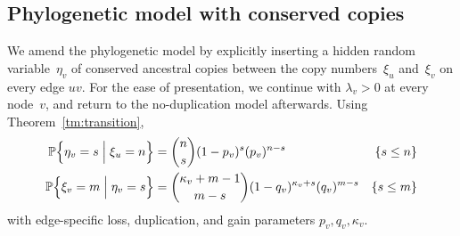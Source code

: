 \documentclass{elsarticle}
\newcommand{\condgen}[6]{{#1}#2 #5 #3 #6 #4}
\newcommand{\EXP}{\mathbb{E}}
\newcommand{\PROB}{\mathbb{P}}
\newcommand{\Probcmd}[2]{\condgen{\PROB}{\Bigl\{}{\Bigm|}{\Bigr\}}{#1}{#2}}
\newcommand{\Expcmd}[2]{\condgen{\EXP}{\Bigl[}{\Bigm|}{\Bigr]}{#1}{#2}}
\newcommand{\nx}{u}
\newcommand{\ny}{v}
\begin{document}
\subsection{Phylogenetic model with conserved copies}
We amend the phylogenetic model by 
explicitly inserting 
a hidden random variable~$\eta_{\ny}$ 
of conserved ancestral copies between 
the copy numbers~$\xi_{\nx}$ and~$\xi_{\ny}$ on every edge $\nx\ny$.  
For the ease of presentation, we continue 
with $\lambda_{\ny}>0$ at every node~$\ny$, 
and return to the no-duplication model afterwards.  
Using Theorem~\ref{tm:transition}, 
\begin{subequations}
\begin{align}
\Probcmd{\eta_{\ny}=s}{\xi_{\nx}=n} & = \binom{n}{s}(1-p_{\ny})^s(p_{\ny})^{n-s} %
& \{s\le n\} \label{eq:cdist.edge}
\\
\Probcmd{\xi_{\ny}=m}{\eta_{\ny}=s} & = \binom{\kappa_{\ny} + m-1}{m-s} (1-q_{\ny})^{\kappa_{\ny}+s} (q_{\ny})^{m-s} 
& \{s\le m\} \label{eq:cdist.node}
\end{align}
\end{subequations}
with edge-specific loss, duplication, and gain parameters $p_{\ny},q_{\ny},\kappa_{\ny}$.  
%
%
\end{document}
